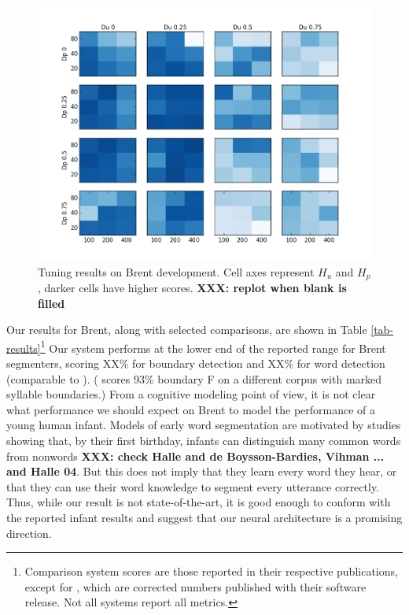 \documentclass[11pt,letterpaper]{article}
\newcommand{\xxx}[1]{\textbf{\color{red}XXX: #1}}
\begin{document}
\begin{figure}
\includegraphics[width=\columnwidth]{heatmap.png}
\caption{Tuning results on Brent development. Cell axes represent
  $H_u$ and $H_p$, darker cells have higher scores. \xxx{replot when
    blank is filled}}
\label{fig-gridsearch}
\end{figure}

Our results for Brent, along with selected comparisons, are shown in
Table \ref{tab-results}\footnote{Comparison system scores are those
  reported in their respective publications, except for
  , which are corrected numbers published with
  their software release. Not all systems report all metrics.} Our
system performs at the lower end of the reported range for Brent
segmenters, scoring XX\% for boundary detection and XX\% for word
detection (comparable to \cite{Fleck08}). ( scores
93\% boundary F on a different corpus with marked syllable
boundaries.) From a cognitive modeling point of view, it is not clear
what performance we should expect on Brent to model the performance of
a young human infant. Models of early word segmentation are motivated
by studies showing that, by their first birthday, infants can
distinguish many common words from nonwords \cite{Swingley05}
\xxx{check Halle and de Boysson-Bardies, Vihman ... and Halle 04}. But
this does not imply that they learn every word they hear, or that they
can use their word knowledge to segment every utterance
correctly. Thus, while our result is not state-of-the-art, it is good
enough to conform with the reported infant results and suggest that
our neural architecture is a promising direction.
\end{document}

